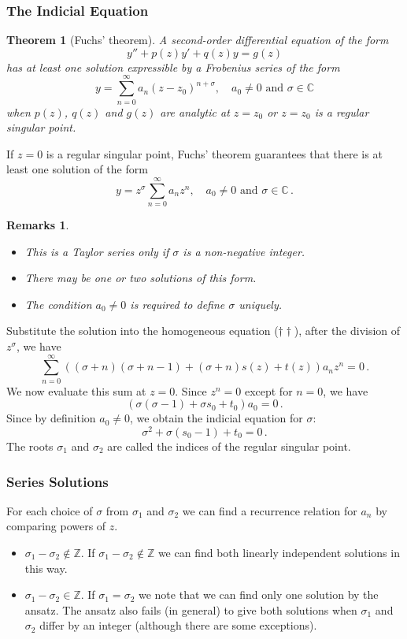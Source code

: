 \documentclass{article}
\theoremstyle{plain}\theoremheaderfont{\normalfont\itshape}\theorembodyfont{\rmfamily}\theoremseparator{.}\newtheorem*{rem}{Remark}\newtheorem*{ex}{Example}\newtheorem*{proof}{Proof}\newtheorem*{altp}{Alternative proof}
\theoremstyle{plain}\theoremheaderfont{\normalfont\bfseries}\theorembodyfont{\rmfamily}\theoremseparator{.}\newtheorem{thm}{Theorem}[section]\newtheorem{lem}[thm]{Lemma}\newtheorem{prop}[thm]{Proposition}\newtheorem*{cor}{Corollary}\newtheorem{defn}[thm]{Definition}\newtheorem{clm}[thm]{Claim}\newtheorem{clminproof}{Claim}
\theoremstyle{break}\theoremheaderfont{\normalfont\itshape}\theorembodyfont{\rmfamily}\theoremseparator{.\medskip}\newtheorem*{proofskip}{Proof}\newtheorem*{exs}{Examples}\newtheorem*{rems}{Remarks}
\theoremstyle{break}\theoremheaderfont{\normalfont\bfseries}\theorembodyfont{\rmfamily}\theoremseparator{.\medskip}\newtheorem{lemskip}[thm]{Lemma}\newtheorem{defnskip}[thm]{Definition}\newtheorem{propskip}[thm]{Proposition}\newtheorem{thmskip}[thm]{Theorem}
\numberwithin{equation}{section}
\begin{document}
	\subsubsection{The Indicial Equation}
	\begin{thm}[Fuchs' theorem]
		A second-order differential equation of the form
		\[y''+p(z)y'+q(z)y=g(z)\]
		has at least one solution expressible by a \textit{Frobenius series} of the form
		\[y=\sum_{n=0}^{\infty}a_{n}(z-z_0)^{n+\sigma},\quad a_{0}\neq 0\text{ and }\sigma\in\mathbb{C}\]
		when \(p(z)\), \(q(z)\) and \(g(z)\) are analytic at \(z=z_0\) or \(z=z_0\) is a regular singular point.
	\end{thm}

	If \(z=0\) is a regular singular point, Fuchs' theorem guarantees that there is at least one solution of the form
	\[y=z^\sigma\sum_{n=0}^{\infty}a_nz^n,\quad a_{0}\neq 0\text{ and }\sigma\in\mathbb{C}\,.\]

	\begin{rems}
		\begin{itemize}[topsep=0pt]
			\item This is a Taylor series only if \(\sigma\) is a non-negative integer.
			\item There may be one or two solutions of this form.
			\item The condition \(a_0\ne 0\) is required to define \(\sigma\) uniquely.
		\end{itemize}
	\end{rems}

	Substitute the solution into the homogeneous equation (\(\dagger\dagger\)), after the division of \(z^\sigma\), we have
	\[\sum_{n=0}^{\infty}((\sigma+n)(\sigma+n-1)+(\sigma+n)s(z)+t(z))a_nz^n=0\,.\]
	We now evaluate this sum at \(z=0\). Since \(z^n=0\) except for \(n=0\), we have
	\[(\sigma(\sigma-1)+\sigma s_0+t_0)a_0=0\,.\]
	Since by definition \(a_0\ne 0\), we obtain the indicial equation for \(\sigma\):
	\[\sigma^2+\sigma(s_0-1)+t_0=0\,.\]
	The roots \(\sigma_1\) and \(\sigma_2\) are called the indices of the regular singular point.
	\subsubsection{Series Solutions}
	For each choice of \(\sigma\) from \(\sigma_1\) and \(\sigma_2\) we can find a recurrence relation for \(a_n\) by comparing powers of \(z\).

	\begin{itemize}
		\item \(\sigma_1-\sigma_2\notin\mathbb{Z}\). If \(\sigma_1-\sigma_2\notin\mathbb{Z}\) we can find both linearly independent solutions in this way.
		\item \(\sigma_1-\sigma_2\in\mathbb{Z}\). If \(\sigma_1=\sigma_2\) we note that we can find only one solution by the ansatz. The ansatz also fails (in general) to give both solutions when \(\sigma_1\) and \(\sigma_2\) differ by an integer (although there are some exceptions).
	\end{itemize}
\end{document}

